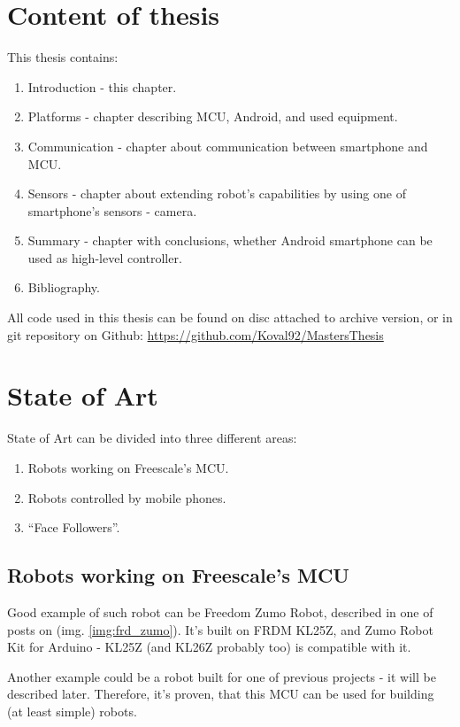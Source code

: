 \section{Content of thesis}
This thesis contains:
\begin{enumerate}
  \item Introduction - this chapter.
  \item Platforms - chapter describing MCU, Android, and used equipment.
  \item Communication - chapter about communication between smartphone and MCU.
  \item Sensors - chapter about extending robot's capabilities by using one of
  smartphone's sensors - camera.
  \item Summary - chapter with conclusions, whether Android smartphone can be
  used as high-level controller.
  \item Bibliography.
\end{enumerate}
All code used in this thesis can be found on disc attached to archive version,
or in git repository on Github: \url{https://github.com/Koval92/MastersThesis}

\section{State of Art}
State of Art can be divided into three different areas:
\begin{enumerate}
  \item Robots working on Freescale's MCU.
  \item Robots controlled by mobile phones.
  \item ``Face Followers''.
\end{enumerate}

\subsection{Robots working on Freescale's MCU}
Good example of such robot can be Freedom Zumo Robot, described in one of posts
on \cite{mcu_on_eclipse} (img. \ref{img:frd_zumo}).
It's built on FRDM KL25Z, and Zumo Robot Kit for Arduino - KL25Z (and KL26Z
probably too) is compatible with it.

Another example could be a robot built for one of previous projects - it will be
described later.
Therefore, it's proven, that this MCU can be used for building (at least simple)
robots.

